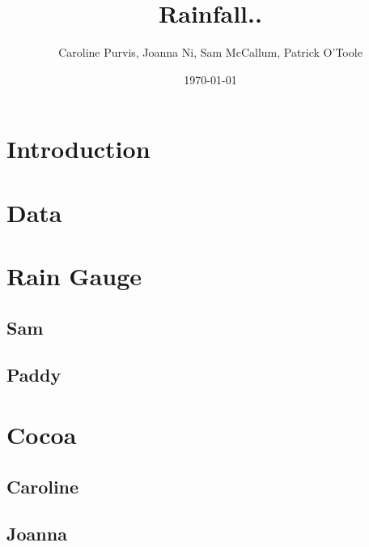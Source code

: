 \documentclass{article}
\title{Rainfall..}
\author{Caroline Purvis, Joanna Ni, Sam McCallum, Patrick O'Toole}
\date{\today}
\begin{document}
\maketitle

\clearpage

\tableofcontents

\clearpage



\section{Introduction}

\section{Data}

\section{Rain Gauge}

\subsection{Sam}

\subsection{Paddy}

\newpage

\section{Cocoa}

\subsection{Caroline}

\subsection{Joanna}
\end{document}
